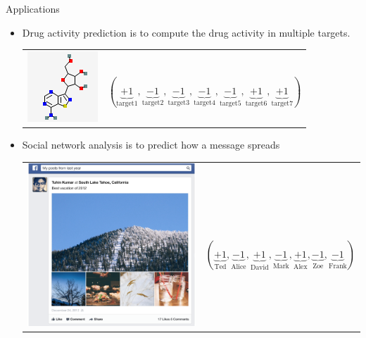 \documentclass[first=purple,second=dgreen,logo=redexc]{aaltoslides}
\begin{document}
{\begin{frame}{Applications}
\begin{itemize}
\begin{tabular}{p{3cm}p{10cm}}
        \end{tabular}
		\item Drug activity prediction is to compute the drug activity in multiple targets.
		\begin{tabular}{p{3cm}p{10cm}} 
        \multirow{2}{*}{\includegraphics[scale = 0.4]{./figures/mol1.png}} & \\
		& $(\underbrace{+1}_{\text{target1}},\underbrace{-1}_{\text{target2}},\underbrace{-1}_{\text{target3}},\underbrace{-1}_{\text{target4}},\underbrace{-1}_{\text{target5}},\underbrace{+1}_{\text{target6}},\underbrace{+1}_{\text{target7}})$\\
        \end{tabular}
		\item Social network analysis is to predict how a message spreads 
		\begin{tabular}{p{3cm}p{10cm}} 
        \multirow{2}{*}{\includegraphics[scale = 0.07]{./figures/facebookvideo.png}} & \\
		& $(\underbrace{+1}_{\text{Ted}},\underbrace{-1}_{\text{Alice}},\underbrace{+1}_{\text{David}},\underbrace{-1}_{\text{Mark}},\underbrace{+1}_{\text{Alex}},\underbrace{-1}_{\text{Zoe}},\underbrace{-1}_{\text{Frank}})$\\
        \end{tabular}
	\end{itemize}
\end{frame}


}
\end{document}
